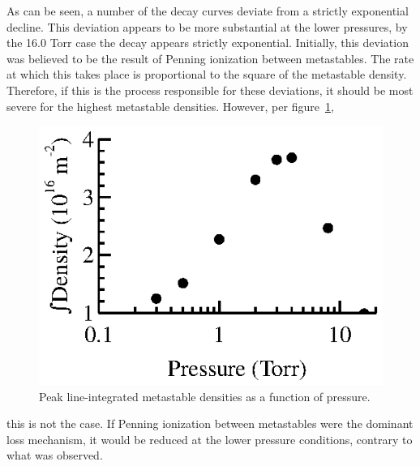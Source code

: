 As can be seen, a number of the decay curves deviate from a strictly exponential
decline. This deviation appears to be more substantial at the lower pressures,
by the 16.0 Torr case the decay appears strictly exponential. Initially, this
deviation was believed to be the result of Penning ionization between
metastables. The rate at which this takes place is proportional to the square of
the metastable density. Therefore, if this is the process responsible for these
deviations, it should be most severe for the highest metastable densities.
However, per figure~\ref{fig:peaknm},
\begin{figure}
  \centering
  \includegraphics{./chapters/metastables/figures/peaknm.eps}
  \caption{Peak line-integrated metastable densities as a function of pressure.}
  \label{fig:peaknm}
\end{figure}
this is not the case. If Penning ionization between metastables were the
dominant loss mechanism, it would be reduced at the lower pressure conditions,
contrary to what was observed.

